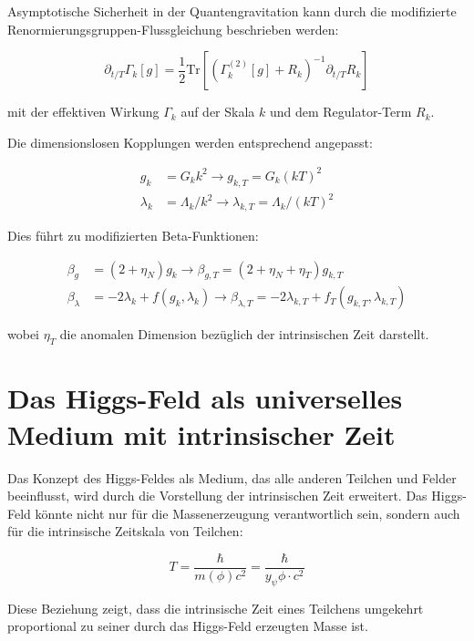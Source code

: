 \documentclass{article}
\begin{document}
	Asymptotische Sicherheit in der Quantengravitation kann durch die modifizierte Renormierungsgruppen-Flussgleichung beschrieben werden:
	
	\begin{equation}
		\partial_{t/T} \Gamma_k[g] = \frac{1}{2} \text{Tr}\left[\left(\Gamma_k^{(2)}[g] + R_k\right)^{-1} \partial_{t/T} R_k\right]
	\end{equation}
	
	mit der effektiven Wirkung $\Gamma_k$ auf der Skala $k$ und dem Regulator-Term $R_k$.
	
	Die dimensionslosen Kopplungen werden entsprechend angepasst:
	
	\begin{align}
		g_k &= G_k k^2 \rightarrow g_{k,T} = G_k (kT)^2 \\
		\lambda_k &= \Lambda_k/k^2 \rightarrow \lambda_{k,T} = \Lambda_k/(kT)^2
	\end{align}
	
	Dies führt zu modifizierten Beta-Funktionen:
	
	\begin{align}
		\beta_g &= (2 + \eta_N)g_k \rightarrow \beta_{g,T} = (2 + \eta_N + \eta_T)g_{k,T} \\
		\beta_\lambda &= -2\lambda_k + f(g_k,\lambda_k) \rightarrow \beta_{\lambda,T} = -2\lambda_{k,T} + f_T(g_{k,T},\lambda_{k,T})
	\end{align}
	
	wobei $\eta_T$ die anomalen Dimension bezüglich der intrinsischen Zeit darstellt.
	
	\section{Das Higgs-Feld als universelles Medium mit intrinsischer Zeit}
	
	Das Konzept des Higgs-Feldes als Medium, das alle anderen Teilchen und Felder beeinflusst, wird durch die Vorstellung der intrinsischen Zeit erweitert. Das Higgs-Feld könnte nicht nur für die Massenerzeugung verantwortlich sein, sondern auch für die intrinsische Zeitskala von Teilchen:
	
	\begin{equation}
		T = \frac{\hbar}{m(\phi)c^2} = \frac{\hbar}{y_\psi \phi \cdot c^2}
	\end{equation}
	
	Diese Beziehung zeigt, dass die intrinsische Zeit eines Teilchens umgekehrt proportional zu seiner durch das Higgs-Feld erzeugten Masse ist.
	
\end{document}
